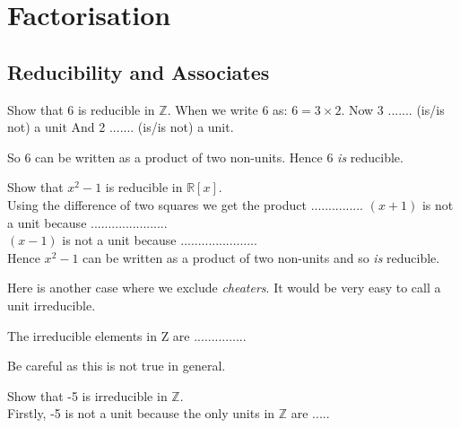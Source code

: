 
\chapter{Factorisation}




\section{Reducibility and Associates}



\begin{example}
Show that 6 is reducible in $\mathbb{Z}$. When we write 6 as:  $6 = 3 \times 2$.
Now 3 ....... (is/is not) a unit
And 2 ....... (is/is not) a unit.

So 6 can be written as a product of two non-units. Hence 6 \textit{is} reducible.
\end{example}

\begin{example}
Show that $x^{2} - 1$ is reducible in $\mathbb{R}[x]$. \\
Using the difference of two squares we get the product ...............
$(x+1)$ is not a unit because ......................\\
$(x-1)$ is not a unit because ......................\\
Hence $x^{2} - 1$ can be written as a product of two non-units and so \textit{is} reducible. 
\end{example}




Here is another case where we exclude \textit{cheaters}. It would be very easy to call 
a unit irreducible. 

\begin{example}
The irreducible elements in Z are ...............
\end{example}

Be careful as this is not true in general.


\begin{example}
Show that -5 is irreducible in $\mathbb{Z}$. \\
Firstly, -5 is not a unit because the only units in $\mathbb{Z}$ are .....
\end{example}








